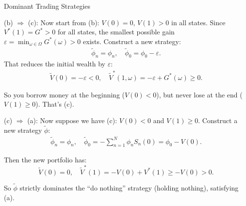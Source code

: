 \documentclass{beamer}
\begin{document}
\begin{frame}{Dominant Trading Strategies}

    {\footnotesize \footnotesize
    \par  (b) \(\Rightarrow\) (c): Now start from (b): \( V(0) = 0 \), \( V(1) > 0 \) in all states.
    Since \( V^*(1) = G^* > 0 \) for all states, the smallest possible gain $\varepsilon = \min_{\omega \in \Omega} G^*(\omega) > 0$
    exists. Construct a new strategy:
    \vspace{-1em}
    \begin{align*}
        \tilde{\phi}_n = \phi_n, \quad \tilde{\phi}_0 = \phi_0 - \varepsilon.
    \end{align*}
    That reduces the initial wealth by \(\varepsilon\):
    \begin{align*}
        \tilde{V}(0) = -\varepsilon < 0, \quad \tilde{V}^*(1, \omega) = -\varepsilon + G^*(\omega) \geq 0.
    \end{align*}
    \par So you borrow money at the beginning (\(V(0) < 0\)), but never lose at the end (\(V(1) \geq 0\)). That's (c).
    \par  \pause (c) $\Rightarrow$ (a): Now suppose we have (c): \( V(0) < 0 \) and \( V(1) \geq 0 \). 
    Construct a new strategy \(\tilde{\phi}\):
    \vspace{-1em}
    \begin{align*}
        \tilde{\phi}_n = \phi_n, \quad \tilde{\phi}_0 = -\sum_{n=1}^{N} \phi_n S_n(0) = \phi_0 - V(0).
    \end{align*}
    \vspace{-1em}
    \par Then the new portfolio has:
%
\[
\tilde{V}(0) = 0, \quad \tilde{V}^*(1) = -V(0) + V^*(1) \geq -V(0) > 0.
\]
\par So \(\tilde{\phi}\) strictly dominates the ``do nothing'' strategy (holding nothing), satisfying (a).
    }
\end{frame}
\end{document}

